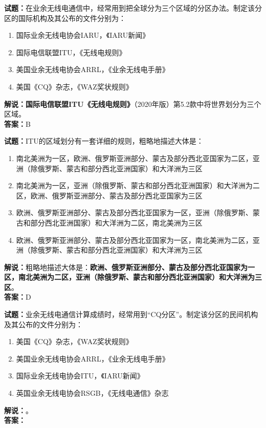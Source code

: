 \documentclass{ctexbook}
\begin{document}
\vspace{\baselineskip}

\noindent\textbf{试题：}在业余无线电通信中，经常用到把全球分为三个区域的分区办法。制定该分区的国际机构及其公布的文件分别为：
\begin{enumerate}[leftmargin=3em]
  \item 国际业余无线电协会IARU，《IARU新闻》
  \item 国际电信联盟ITU，《无线电规则》
  \item 美国业余无线电协会ARRL，《业余无线电手册》
  \item 美国《CQ》杂志，《WAZ奖状规则》
\end{enumerate}
\noindent\textbf{解说：}\textbf{国际电信联盟ITU《无线电规则》}（2020年版）第5.2款中将世界划分为三个区域。\\\noindent\textbf{答案：}B

\vspace{\baselineskip}

\noindent\textbf{试题：}ITU的区域划分有一套详细的规则，粗略地描述大体是：
\begin{enumerate}[leftmargin=3em]
  \item 南北美洲为一区，欧洲、俄罗斯亚洲部分、蒙古及部分西北亚国家为二区，亚洲（除俄罗斯、蒙古和部分西北亚洲国家）和大洋洲为三区
  \item 南北美洲为一区，亚洲（除俄罗斯、蒙古和部分西北亚洲国家）和大洋洲为二区，欧洲、俄罗斯亚洲部分、蒙古及部分西北亚国家为三区
  \item 欧洲、俄罗斯亚洲部分、蒙古及部分西北亚国家为一区，亚洲（除俄罗斯、蒙古和部分西北亚洲国家）和大洋洲为二区，南北美洲为三区%
  \item 欧洲、俄罗斯亚洲部分、蒙古及部分西北亚国家为一区，南北美洲为二区，亚洲（除俄罗斯、蒙古和部分西北亚洲国家）和大洋洲为三区
\end{enumerate}
\noindent\textbf{解说：}粗略地描述大体是：\textbf{欧洲、俄罗斯亚洲部分、蒙古及部分西北亚国家为一区，南北美洲为二区，亚洲（除俄罗斯、蒙古和部分西北亚洲国家）和大洋洲为三区}。\\\noindent\textbf{答案：}D

\vspace{\baselineskip}

\noindent\textbf{试题：}业余无线电通信计算成绩时，经常用到“CQ分区”。制定该分区的民间机构及其公布的文件分别为：
\begin{enumerate}[leftmargin=3em]
  \item 美国《CQ》杂志，《WAZ奖状规则》
  \item 美国业余无线电协会ARRL，《业余无线电手册》
  \item 国际业余无线电协会ITU，《IARU新闻》
  \item 英国业余无线电协会RSGB，《无线电通信》杂志
\end{enumerate}
\noindent\textbf{解说：}\textbf{}。\\\noindent\textbf{答案：}
\end{document}
